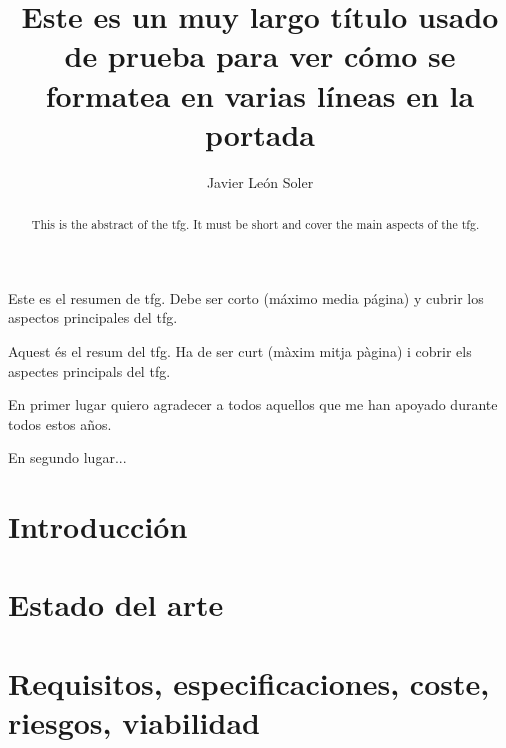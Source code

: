 \documentclass[twoside,spanish,a4paper,12pt]{tfg}
\title{Este es un muy largo título usado de prueba para ver cómo se formatea en varias líneas en la portada}
\author{Javier León Soler}
\begin{document}
\portada
\cleardoublepage
\contraportada
\cleardoublepage
\declaracion
\cleardoublepage


\begin{resumen}
  Este es el resumen de \gls{tfg}. Debe ser corto (máximo media página) y cubrir los aspectos principales del \gls{tfg}.
\end{resumen}
\cleardoublepage

\begin{abstract}
  This is the abstract of the \gls{tfg}. It must be short and cover the main aspects of the \gls{tfg}.
\end{abstract}
\cleardoublepage

\begin{resum}
  Aquest és el resum del \gls{tfg}. Ha de ser curt (màxim mitja pàgina) i cobrir els aspectes principals del \gls{tfg}.
\end{resum}
\cleardoublepage


\begin{agradecimientos}
  En primer lugar quiero agradecer a todos aquellos que me han apoyado durante todos estos años.

  En segundo lugar...
\end{agradecimientos}
\cleardoublepage



\tableofcontents
\cleardoublepage
\listoffigures
\cleardoublepage
\listoftables
\cleardoublepage
\lstlistoflistings


\pagestyle{tfg}
\justify



\chapter{Introducción}


\chapter{Estado del arte}\label{ch:estado-arte}


\chapter{Requisitos, especificaciones, coste, riesgos, viabilidad}\label{ch:requisitos}

\end{document}
